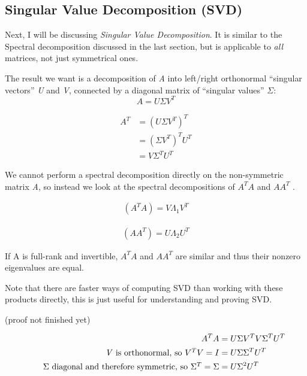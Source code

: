 \documentclass[12pt]{article}
\theoremstyle{definition}
\begin{document}
\subsection{Singular Value Decomposition (SVD)}

Next, I will be discussing \textit{Singular Value Decomposition}. 
It is similar to the Spectral decomposition  discussed in the last section, but is applicable to \textit{all} matrices, not just symmetrical ones.

The result we want is a decomposition of \textit{A} into left/right orthonormal ``singular vectors'' \textit{U} and \textit{V}, connected by a diagonal matrix of ``singular values'' $\Sigma$:
\begin{equation}
	A = U \Sigma V^T
	\label{eq:SVD}
\end{equation}


\begin{align*}
	A^T &= (U \Sigma V^T)^T \\
	&= (\Sigma V^T)^T U^T \\
	&= V \Sigma^T U^T 
\end{align*}

We cannot perform a spectral decomposition directly on the non-symmetric matrix \textit{A}, so instead we look at the spectral decompositions of $A^T A$ and $A A^T$ .

\begin{align*}
	(A^T A ) = V \Lambda_1 V^T
\end{align*}

\begin{align*}
	(A A^T) = U \Lambda_2 U^T
\end{align*}

If A is full-rank and invertible, $A^T A$ and $A A^T$ are similar and thus their nonzero eigenvalues are equal.




Note that there are faster ways of computing SVD than working with these products directly, this is just useful for understanding and proving SVD.

(proof not finished yet)



\begin{align*}
	A^T A &= U \Sigma V^T V \Sigma^T U^T  \\
	\tag*{\textit{V} is orthonormal, so $V^T V = I$}
	&= U \Sigma \Sigma^T U^T  \\
	\tag*{$\Sigma$ diagonal and therefore symmetric, so $\Sigma^T = \Sigma$}
	&= U \Sigma^2 U^T 
\end{align*}
\end{document}

